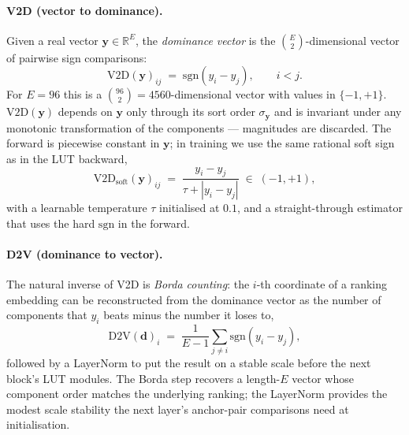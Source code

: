 \documentclass[11pt]{article}
\begin{document}
\paragraph{V2D (vector to dominance).}
Given a real vector $\mathbf{y} \in \mathbb{R}^{E}$, the \emph{dominance vector} is the $\binom{E}{2}$-dimensional vector of pairwise sign comparisons:
\begin{equation}
    \mathrm{V2D}(\mathbf{y})_{ij} \;=\; \mathrm{sgn}(y_i - y_j), \qquad i < j.
    \label{eq:v2d}
\end{equation}
For $E = 96$ this is a $\binom{96}{2} = 4560$-dimensional vector with values in $\{-1, +1\}$.
$\mathrm{V2D}(\mathbf{y})$ depends on $\mathbf{y}$ only through its sort order $\sigma_\mathbf{y}$ and is invariant under any monotonic transformation of the components --- magnitudes are discarded.
The forward is piecewise constant in $\mathbf{y}$; in training we use the same rational soft sign as in the LUT backward,
\begin{equation}
    \mathrm{V2D}_{\text{soft}}(\mathbf{y})_{ij} \;=\; \frac{y_i - y_j}{\tau + |y_i - y_j|} \;\in\; (-1, +1),
\end{equation}
with a learnable temperature $\tau$ initialised at $0.1$, and a straight-through estimator that uses the hard $\mathrm{sgn}$ in the forward.

\paragraph{D2V (dominance to vector).}
The natural inverse of V2D is \emph{Borda counting}: the $i$-th coordinate of a ranking embedding can be reconstructed from the dominance vector as the number of components that $y_i$ beats minus the number it loses to,
\begin{equation}
    \mathrm{D2V}(\mathbf{d})_i \;=\; \frac{1}{E - 1} \sum_{j \neq i} \mathrm{sgn}(y_i - y_j),
    \label{eq:d2v}
\end{equation}
followed by a LayerNorm to put the result on a stable scale before the next block's LUT modules.
The Borda step recovers a length-$E$ vector whose component order matches the underlying ranking; the LayerNorm provides the modest scale stability the next layer's anchor-pair comparisons need at initialisation.
\end{document}
